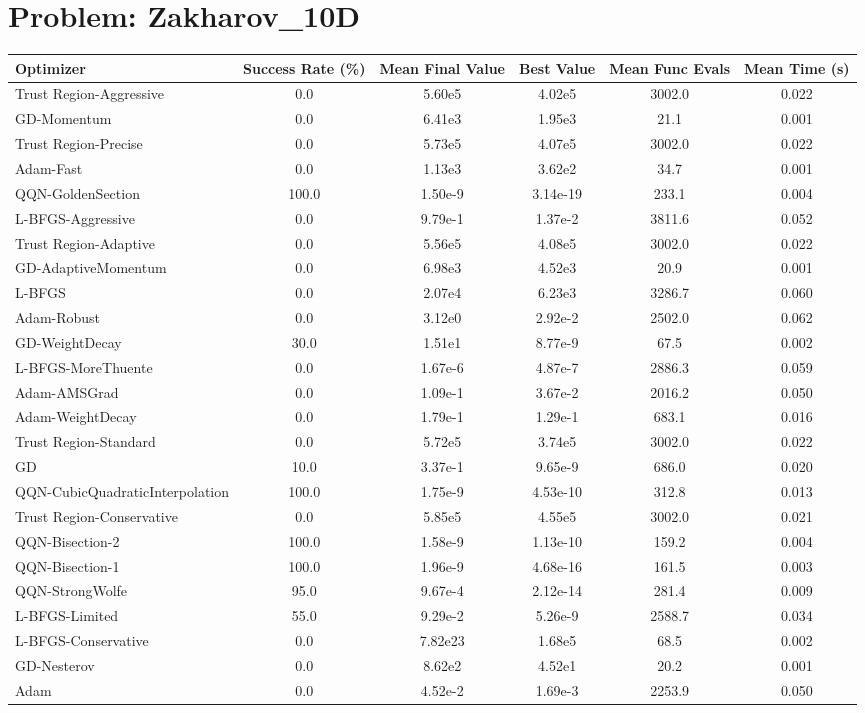 \documentclass{article}
\begin{document}
\section{Problem: Zakharov\_10D}
\begin{longtable}{p{3cm}*{5}{c}}
\toprule
\textbf{Optimizer} & \textbf{Success Rate (\%)} & \textbf{Mean Final Value} & \textbf{Best Value} & \textbf{Mean Func Evals} & \textbf{Mean Time (s)} \\
\midrule
Trust Region-Aggressive & 0.0 & 5.60e5 & 4.02e5 & 3002.0 & 0.022 \\
GD-Momentum & 0.0 & 6.41e3 & 1.95e3 & 21.1 & 0.001 \\
Trust Region-Precise & 0.0 & 5.73e5 & 4.07e5 & 3002.0 & 0.022 \\
Adam-Fast & 0.0 & 1.13e3 & 3.62e2 & 34.7 & 0.001 \\
QQN-GoldenSection & 100.0 & 1.50e-9 & 3.14e-19 & 233.1 & 0.004 \\
L-BFGS-Aggressive & 0.0 & 9.79e-1 & 1.37e-2 & 3811.6 & 0.052 \\
Trust Region-Adaptive & 0.0 & 5.56e5 & 4.08e5 & 3002.0 & 0.022 \\
GD-AdaptiveMomentum & 0.0 & 6.98e3 & 4.52e3 & 20.9 & 0.001 \\
L-BFGS & 0.0 & 2.07e4 & 6.23e3 & 3286.7 & 0.060 \\
Adam-Robust & 0.0 & 3.12e0 & 2.92e-2 & 2502.0 & 0.062 \\
GD-WeightDecay & 30.0 & 1.51e1 & 8.77e-9 & 67.5 & 0.002 \\
L-BFGS-MoreThuente & 0.0 & 1.67e-6 & 4.87e-7 & 2886.3 & 0.059 \\
Adam-AMSGrad & 0.0 & 1.09e-1 & 3.67e-2 & 2016.2 & 0.050 \\
Adam-WeightDecay & 0.0 & 1.79e-1 & 1.29e-1 & 683.1 & 0.016 \\
Trust Region-Standard & 0.0 & 5.72e5 & 3.74e5 & 3002.0 & 0.022 \\
GD & 10.0 & 3.37e-1 & 9.65e-9 & 686.0 & 0.020 \\
QQN-CubicQuadraticInterpolation & 100.0 & 1.75e-9 & 4.53e-10 & 312.8 & 0.013 \\
Trust Region-Conservative & 0.0 & 5.85e5 & 4.55e5 & 3002.0 & 0.021 \\
QQN-Bisection-2 & 100.0 & 1.58e-9 & 1.13e-10 & 159.2 & 0.004 \\
QQN-Bisection-1 & 100.0 & 1.96e-9 & 4.68e-16 & 161.5 & 0.003 \\
QQN-StrongWolfe & 95.0 & 9.67e-4 & 2.12e-14 & 281.4 & 0.009 \\
L-BFGS-Limited & 55.0 & 9.29e-2 & 5.26e-9 & 2588.7 & 0.034 \\
L-BFGS-Conservative & 0.0 & 7.82e23 & 1.68e5 & 68.5 & 0.002 \\
GD-Nesterov & 0.0 & 8.62e2 & 4.52e1 & 20.2 & 0.001 \\
Adam & 0.0 & 4.52e-2 & 1.69e-3 & 2253.9 & 0.050 \\
\bottomrule
\end{longtable}
\end{document}
